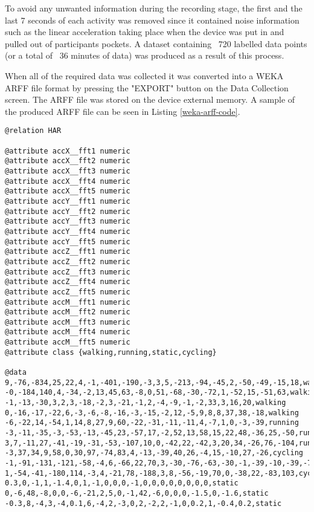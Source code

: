     To avoid any unwanted information during the recording stage, the first and the last 7 seconds of each activity was removed since it contained noise information such as the linear acceleration taking place when the device was put in and pulled out of participants pockets. A dataset containing ~720 labelled data points (or a total of ~36 minutes of data) was produced as a result of this process. 
    
    When all of the required data was collected it was converted into a WEKA ARFF file format by pressing the "EXPORT" button on the Data Collection screen. The ARFF file was stored on the device external memory. A sample of the produced ARFF file can be seen in Listing \ref{weka-arff-code}.
    
\begin{lstlisting}[caption=WEKA ARFF file extract,
label=weka-arff-code,captionpos=b, frame=single,basicstyle=\small,float,floatplacement=H,breaklines=true]
@relation HAR
    
@attribute accX__fft1 numeric
@attribute accX__fft2 numeric
@attribute accX__fft3 numeric
@attribute accX__fft4 numeric
@attribute accX__fft5 numeric
@attribute accY__fft1 numeric
@attribute accY__fft2 numeric
@attribute accY__fft3 numeric
@attribute accY__fft4 numeric
@attribute accY__fft5 numeric
@attribute accZ__fft1 numeric
@attribute accZ__fft2 numeric
@attribute accZ__fft3 numeric
@attribute accZ__fft4 numeric
@attribute accZ__fft5 numeric
@attribute accM__fft1 numeric
@attribute accM__fft2 numeric
@attribute accM__fft3 numeric
@attribute accM__fft4 numeric
@attribute accM__fft5 numeric
@attribute class {walking,running,static,cycling}
    
@data
9,-76,-834,25,22,4,-1,-401,-190,-3,3,5,-213,-94,-45,2,-50,-49,-15,18,walking
-0,-184,140,4,-34,-2,13,45,63,-8,0,51,-68,-30,-72,1,-52,15,-51,63,walking
-1,-13,-30,3,2,3,-18,-2,3,-21,-1,2,-4,-9,-1,-2,33,3,16,20,walking
0,-16,-17,-22,6,-3,-6,-8,-16,-3,-15,-2,12,-5,9,8,8,37,38,-18,walking
-6,-22,14,-54,1,14,8,27,9,60,-22,-31,-11,-11,4,-7,1,0,-3,-39,running
-3,-11,-35,-3,-53,-13,-45,23,-57,17,-2,52,13,58,15,22,48,-36,25,-50,running
3,7,-11,27,-41,-19,-31,-53,-107,10,0,-42,22,-42,3,20,34,-26,76,-104,running
-3,37,34,9,58,0,30,97,-74,83,4,-13,-39,40,26,-4,15,-10,27,-26,cycling
-1,-91,-131,-121,-58,-4,6,-66,22,70,3,-30,-76,-63,-30,-1,-39,-10,-39,-76,cycling
1,-54,-41,-180,114,-3,4,-21,78,-188,3,8,-56,-19,70,0,-38,22,-83,103,cycling
0.3,0,-1,1,-1.4,0,1,-1,0,0,0,-1,0,0,0,0,0,0,0,0,static
0,-6,48,-8,0,0,-6,-21,2,5,0,-1,42,-6,0,0,0,-1.5,0,-1.6,static
-0.3,8,-4,3,-4,0.1,6,-4,2,-3,0,2,-2,2,-1,0,0.2,1,-0.4,0.2,static
\end{lstlisting}
    
